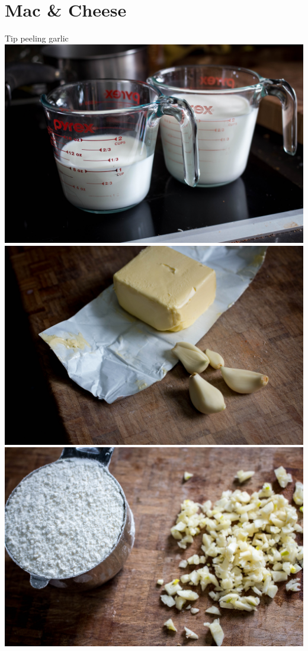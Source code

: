 \chapter*{Mac \& Cheese}
\renewcommand{\chaptertitle}{Mac \& Cheese}

Tip peeling garlic
\includegraphics[width=\textwidth]{food/mac-n-cheese/images/hi-res/01.jpg}
\newpage
\includegraphics[width=\textwidth]{food/mac-n-cheese/images/hi-res/02.jpg}
\newpage
\includegraphics[width=\textwidth]{food/mac-n-cheese/images/hi-res/03.jpg}
